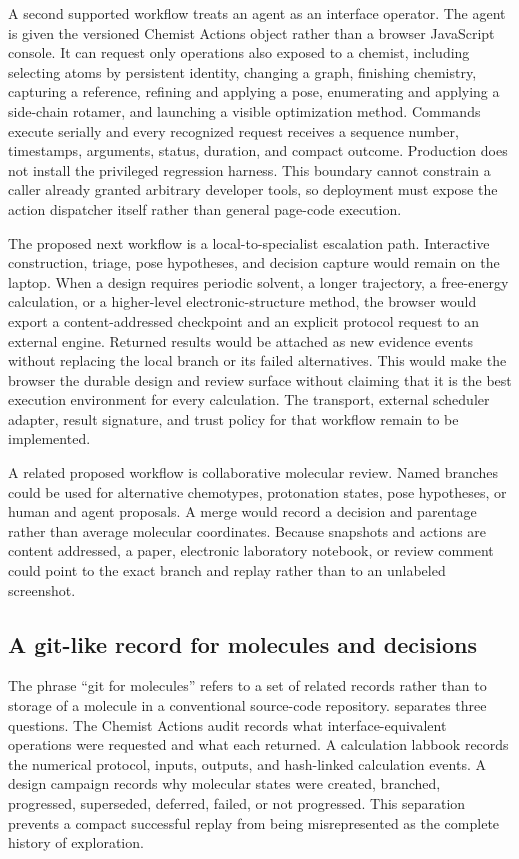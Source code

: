 A second supported workflow treats an agent as an interface operator.
The agent is given the versioned Chemist Actions object rather than a browser
JavaScript console.
It can request only operations also exposed to a chemist, including selecting
atoms by persistent identity, changing a graph, finishing chemistry, capturing
a reference, refining and applying a pose, enumerating and applying a side-chain
rotamer, and launching a visible optimization method.
Commands execute serially and every recognized request receives a sequence
number, timestamps, arguments, status, duration, and compact outcome.
Production does not install the privileged regression harness.
This boundary cannot constrain a caller already granted arbitrary developer
tools, so deployment must expose the action dispatcher itself rather than
general page-code execution.

The proposed next workflow is a local-to-specialist escalation path.
Interactive construction, triage, pose hypotheses, and decision capture would
remain on the laptop.
When a design requires periodic solvent, a longer trajectory, a free-energy
calculation, or a higher-level electronic-structure method, the browser would
export a content-addressed checkpoint and an explicit protocol request to an
external engine.
Returned results would be attached as new evidence events without replacing
the local branch or its failed alternatives.
This would make the browser the durable design and review surface without
claiming that it is the best execution environment for every calculation.
The transport, external scheduler adapter, result signature, and trust policy
for that workflow remain to be implemented.

A related proposed workflow is collaborative molecular review.
Named branches could be used for alternative chemotypes, protonation states,
pose hypotheses, or human and agent proposals.
A merge would record a decision and parentage rather than average molecular
coordinates.
Because snapshots and actions are content addressed, a paper, electronic
laboratory notebook, or review comment could point to the exact branch and
replay rather than to an unlabeled screenshot.

\subsection{A git-like record for molecules and decisions}
\label{app:molecular-git}

The phrase ``git for molecules'' refers to a set of related records rather than
to storage of a molecule in a conventional source-code repository.
\molarium{} separates three questions.
The Chemist Actions audit records what interface-equivalent operations were
requested and what each returned.
A calculation labbook records the numerical protocol, inputs, outputs, and
hash-linked calculation events.
A design campaign records why molecular states were created, branched,
progressed, superseded, deferred, failed, or not progressed.
This separation prevents a compact successful replay from being misrepresented
as the complete history of exploration.

